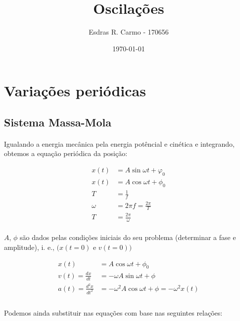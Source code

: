 \documentclass{article}
\author{Esdras R. Carmo - 170656}
\title{Oscilações}
\date{\today}
\begin{document}
    \maketitle
    
    \section{Variações periódicas}
        \subsection{Sistema Massa-Mola}
            \paragraph{}
            Igualando a energia mecânica pela energia potêncial e cinética e integrando, obtemos a equação periódica da
            posição:

            \begin{align*}
                x(t) &= A\sin{\omega t + \varphi_0}\\
                x(t) &= A\cos{\omega t + \phi_0}\\
                T &= \frac{1}{f}\\
                \omega &= 2\pi f = \frac{2\pi}{T}\\
                T &= \frac{2\pi}{\omega}
            \end{align*}

            \paragraph{}
            $A$, $\phi$ são dados pelas condições iniciais do seu problema (determinar a fase e amplitude), i. e.,
            $(x(t=0)$ e $v(t=0))$

            \begin{align*}
                x(t) &= A\cos{\omega t + \phi_0}\\
                v(t) = \frac{dx}{dt} &= -\omega A \sin{\omega t + \phi}\\
                a(t) = \frac{d^2x}{dt^2} &= -\omega^2 A \cos{\omega t + \phi} = -\omega^2 x(t)\\
            \end{align*}

            \paragraph{}
            Podemos ainda substituir nas equações com base nas seguintes relações:
\end{document}
